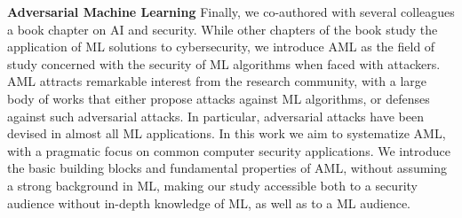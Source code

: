 \begin{myleftbar}
\end{myleftbar}

\textbf{Adversarial Machine Learning}
Finally, we co-authored with several colleagues a book chapter on \gls{AI} and security.
While other chapters of the book study the application of ML solutions to cybersecurity, we introduce \gls{AML} as the field of study concerned with the security of ML algorithms when faced with attackers.
\gls{AML} attracts remarkable interest from the research community, with a large body of works that either propose attacks against \gls{ML} algorithms, or defenses against such adversarial attacks.
In particular, adversarial attacks have been devised in almost all \gls{ML} applications.
In this work we aim to systematize \gls{AML}, with a pragmatic focus on common computer security applications.
We introduce the basic building blocks and fundamental properties of \gls{AML}, without assuming a strong background in \gls{ML}, making our study accessible both to a security audience without in-depth knowledge of \gls{ML}, as well as to a \gls{ML} audience.

\begin{myleftbar}
\end{myleftbar}



